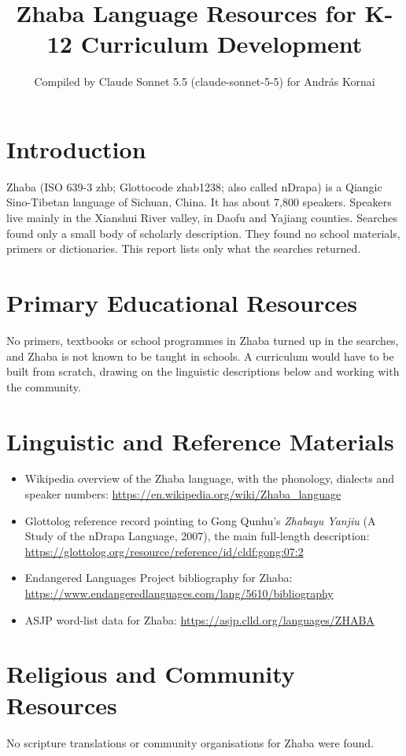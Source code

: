 \documentclass[12pt]{article}
\title{Zhaba Language Resources for K-12 Curriculum Development}
\author{Compiled by Claude Sonnet 5.5 (claude-sonnet-5-5) for Andr\'as Kornai}
\date{}
\begin{document}
\maketitle

\section{Introduction}
Zhaba (ISO 639-3 zhb; Glottocode zhab1238; also called nDrapa) is a Qiangic Sino-Tibetan language of Sichuan, China. It has about 7,800 speakers. Speakers live mainly in the Xianshui River valley, in Daofu and Yajiang counties. Searches found only a small body of scholarly description. They found no school materials, primers or dictionaries. This report lists only what the searches returned.

\section{Primary Educational Resources}
No primers, textbooks or school programmes in Zhaba turned up in the searches, and Zhaba is not known to be taught in schools. A curriculum would have to be built from scratch, drawing on the linguistic descriptions below and working with the community.

\section{Linguistic and Reference Materials}
\begin{itemize}
\item Wikipedia overview of the Zhaba language, with the phonology, dialects and speaker numbers: \url{https://en.wikipedia.org/wiki/Zhaba_language}
\item Glottolog reference record pointing to Gong Qunhu's \emph{Zhabayu Yanjiu} (A Study of the nDrapa Language, 2007), the main full-length description: \url{https://glottolog.org/resource/reference/id/cldf:gong:07:2}
\item Endangered Languages Project bibliography for Zhaba: \url{https://www.endangeredlanguages.com/lang/5610/bibliography}
\item ASJP word-list data for Zhaba: \url{https://asjp.clld.org/languages/ZHABA}
\end{itemize}

\section{Religious and Community Resources}
No scripture translations or community organisations for Zhaba were found.
\end{document}
